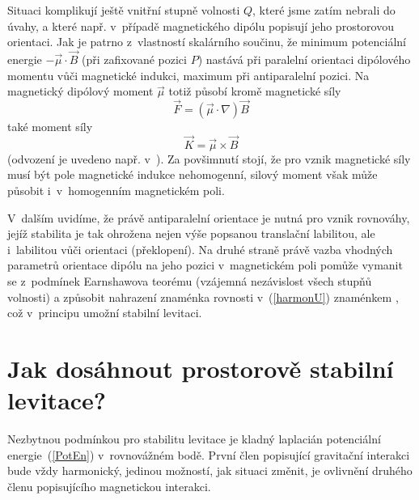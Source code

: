 Situaci komplikují ještě vnitřní stupně volnosti $Q$, které jsme zatím nebrali
do úvahy, a které např. v~případě magnetického dipólu popisují jeho
prostorovou orientaci. Jak je patrno z~vlastností skalárního součinu, že
minimum potenciální energie $-\vec{\mu}\cdot\vec{B}$ (při zafixované pozici
$P$) nastává při paralelní orientaci dipólového momentu vůči magnetické
indukci, maximum při antiparalelní pozici. Na magnetický dipólový moment
$\vec{\mu}$ totiž působí kromě magnetické síly
\begin{equation}
  \vec{F} = (\vec{\mu}\cdot\nabla)\vec{B}                           \label{Fdip}
\end{equation}
také moment síly
\begin{equation}
  \vec{K} = \vec{\mu}\times\vec{B}                                  \label{Kdip}
\end{equation}
(odvození je uvedeno např. v~\cite{Pur-Mor:2013:ElectMagn:3}). Za povšimnutí
stojí, že pro vznik magnetické síly musí být pole magnetické indukce
nehomogenní, silový moment však může působit i~v~homogenním magnetickém poli.

V~dalším uvidíme, že právě antiparalelní orientace je nutná pro vznik
rovnováhy, jejíž stabilita je tak ohrožena nejen výše popsanou translační
labilitou, ale i~labilitou vůči orientaci (překlopení). Na druhé straně právě
vazba vhodných parametrů orientace dipólu na jeho pozici v~magnetickém poli
pomůže vymanit se z~podmínek Earnshawova teorému (vzájemná nezávislost
všech stupňů volnosti) a způsobit nahrazení znaménka rovnosti
v~(\ref{harmonU}) znaménkem , což v~principu umožní stabilní
levitaci.

\section{Jak dosáhnout prostorově stabilní levitace?}\label{BeyondE}%

Nezbytnou podmínkou pro stabilitu levitace je kladný laplacián potenciální
energie~(\ref{PotEn}) v~rovnovážném bodě. První člen popisující gravitační
interakci bude vždy harmonický, jedinou možností, jak situaci změnit, je
ovlivnění druhého členu popisujícího magnetickou interakci.

